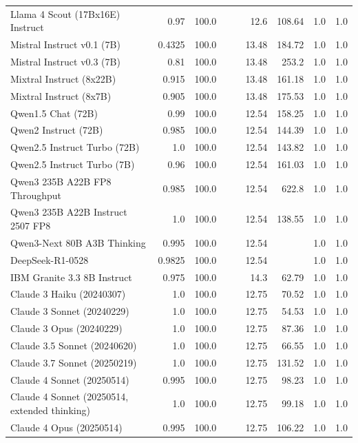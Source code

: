 \begin{table}[htp]
{\begin{tabular}{lrrrrrrrr}
Llama 4 Scout (17Bx16E) Instruct & 0.97 & 100.0 &  &  & 12.6 & 108.64 & 1.0 & 1.0 \\
Mistral Instruct v0.1 (7B) & 0.4325 & 100.0 &  &  & 13.48 & 184.72 & 1.0 & 1.0 \\
Mistral Instruct v0.3 (7B) & 0.81 & 100.0 &  &  & 13.48 & 253.2 & 1.0 & 1.0 \\
Mixtral Instruct (8x22B) & 0.915 & 100.0 &  &  & 13.48 & 161.18 & 1.0 & 1.0 \\
Mixtral Instruct (8x7B) & 0.905 & 100.0 &  &  & 13.48 & 175.53 & 1.0 & 1.0 \\
Qwen1.5 Chat (72B) & 0.99 & 100.0 &  &  & 12.54 & 158.25 & 1.0 & 1.0 \\
Qwen2 Instruct (72B) & 0.985 & 100.0 &  &  & 12.54 & 144.39 & 1.0 & 1.0 \\
Qwen2.5 Instruct Turbo (72B) & 1.0 & 100.0 &  &  & 12.54 & 143.82 & 1.0 & 1.0 \\
Qwen2.5 Instruct Turbo (7B) & 0.96 & 100.0 &  &  & 12.54 & 161.03 & 1.0 & 1.0 \\
Qwen3 235B A22B FP8 Throughput & 0.985 & 100.0 &  &  & 12.54 & 622.8 & 1.0 & 1.0 \\
Qwen3 235B A22B Instruct 2507 FP8 & 1.0 & 100.0 &  &  & 12.54 & 138.55 & 1.0 & 1.0 \\
Qwen3-Next 80B A3B Thinking & 0.995 & 100.0 &  &  & 12.54 &  & 1.0 & 1.0 \\
DeepSeek-R1-0528 & 0.9825 & 100.0 &  &  & 12.54 &  & 1.0 & 1.0 \\
IBM Granite 3.3 8B Instruct & 0.975 & 100.0 &  &  & 14.3 & 62.79 & 1.0 & 1.0 \\
Claude 3 Haiku (20240307) & 1.0 & 100.0 &  &  & 12.75 & 70.52 & 1.0 & 1.0 \\
Claude 3 Sonnet (20240229) & 1.0 & 100.0 &  &  & 12.75 & 54.53 & 1.0 & 1.0 \\
Claude 3 Opus (20240229) & 1.0 & 100.0 &  &  & 12.75 & 87.36 & 1.0 & 1.0 \\
Claude 3.5 Sonnet (20240620) & 1.0 & 100.0 &  &  & 12.75 & 66.55 & 1.0 & 1.0 \\
Claude 3.7 Sonnet (20250219) & 1.0 & 100.0 &  &  & 12.75 & 131.52 & 1.0 & 1.0 \\
Claude 4 Sonnet (20250514) & 0.995 & 100.0 &  &  & 12.75 & 98.23 & 1.0 & 1.0 \\
Claude 4 Sonnet (20250514, extended thinking) & 1.0 & 100.0 &  &  & 12.75 & 99.18 & 1.0 & 1.0 \\
Claude 4 Opus (20250514) & 0.995 & 100.0 &  &  & 12.75 & 106.22 & 1.0 & 1.0 \\

\end{tabular}}
\end{table}
